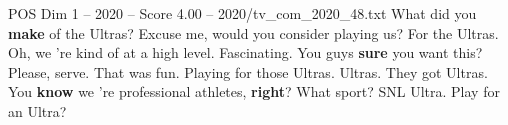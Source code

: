 \begin{textsample}{POS Dim 1 – 2020 – Score 4.00 – 2020/tv\_com\_2020\_48.txt}  \label{ex:f1_pos_087}
What did you \textbf{make} of the Ultras?
Excuse me, would you consider playing us?
For the Ultras.
Oh, we 're kind of at a high level.
Fascinating.
You guys \textbf{sure} you want this?
Please, serve.
That was fun.
Playing for those Ultras.
Ultras.
They got Ultras.
You \textbf{know} we 're professional athletes, \textbf{right}?
What sport?
SNL Ultra.
Play for an Ultra?

\end{textsample}
